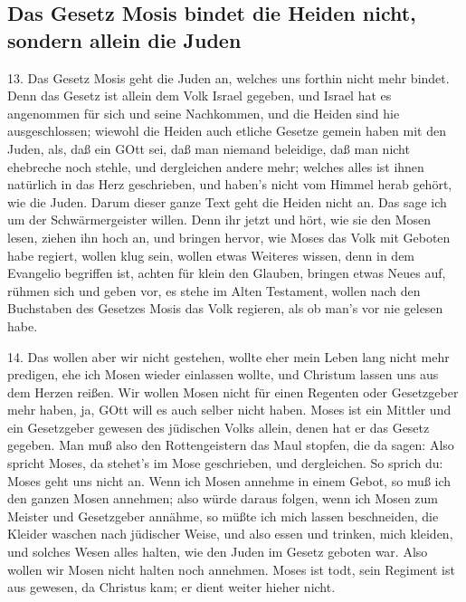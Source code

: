 \subsection[Das Gesetz Mosis bindet die Heiden nicht, sondern]{Das Gesetz Mosis bindet die Heiden nicht, sondern allein die Juden}

13. Das Gesetz Mosis geht die Juden an, welches uns forthin nicht mehr bindet. Denn das Gesetz ist allein dem Volk Israel gegeben, und Israel hat es angenommen für sich und seine Nachkommen, und die Heiden sind hie ausgeschlossen; wiewohl die Heiden auch etliche Gesetze gemein haben mit den Juden, als, daß ein GOtt sei, daß man niemand beleidige, daß man nicht ehebreche noch stehle, und dergleichen andere mehr; welches alles ist ihnen natürlich in das Herz geschrieben, und haben’s nicht vom Himmel herab gehört, wie die Juden. Darum dieser ganze Text geht die Heiden nicht an. Das sage ich um der Schwärmergeister willen. Denn ihr jetzt und hört, wie sie den Mosen lesen, ziehen ihn hoch an, und bringen hervor, wie Moses das Volk mit Geboten habe regiert, wollen klug sein, wollen etwas Weiteres wissen, denn in dem Evangelio begriffen ist, achten für klein den Glauben, bringen etwas Neues auf, rühmen sich und geben vor, es stehe im Alten Testament, wollen nach den Buchstaben des Gesetzes Mosis das Volk regieren, als ob man’s vor nie gelesen habe.

14. Das wollen aber wir nicht gestehen, wollte eher mein Leben lang nicht mehr predigen, ehe ich Mosen wieder einlassen wollte, und Christum lassen uns aus dem Herzen reißen. Wir wollen Mosen nicht für einen Regenten oder Gesetzgeber mehr haben, ja, GOtt will es auch selber nicht haben. Moses ist ein Mittler und ein Gesetzgeber gewesen des jüdischen Volks allein, denen hat er das Gesetz gegeben. Man muß also den Rottengeistern das Maul stopfen, die da sagen: Also spricht Moses, da stehet’s im Mose geschrieben, und dergleichen. So sprich du: Moses geht uns nicht an. Wenn ich Mosen annehme in einem Gebot, so muß ich den ganzen Mosen annehmen; also würde daraus folgen, wenn ich Mosen zum Meister und Gesetzgeber annähme, so müßte ich mich lassen beschneiden, die Kleider waschen nach jüdischer Weise, und also essen und trinken, mich kleiden, und solches Wesen alles halten, wie den Juden im Gesetz geboten war. Also wollen wir Mosen nicht halten noch annehmen. Moses ist todt, sein Regiment ist aus gewesen, da Christus kam; er dient weiter hieher nicht.

